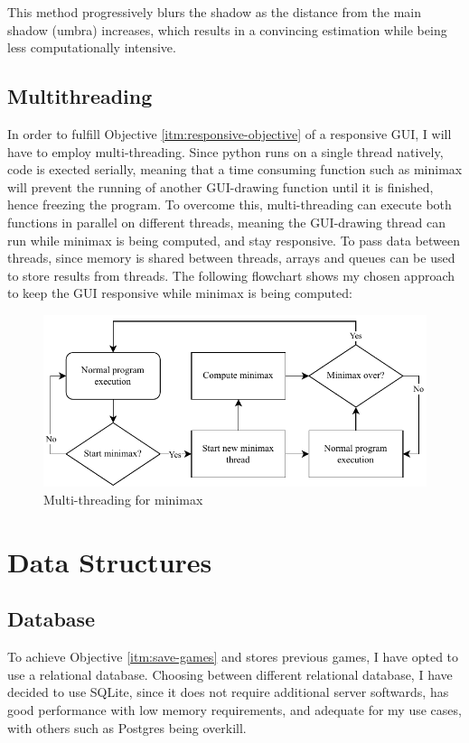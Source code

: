 \documentclass[../main/main.tex]{subfiles}
\begin{document}
This method progressively blurs the shadow as the distance from the main shadow (umbra) increases, which results in a convincing estimation while being less computationally intensive.

\subsection{Multithreading}
\label{sec:design-multithreading}
In order to fulfill Objective \ref{itm:responsive-objective} of a responsive GUI, I will have to employ multi-threading. Since python runs on a single thread natively, code is exected serially, meaning that a time consuming function such as minimax will prevent the running of another GUI-drawing function until it is finished, hence freezing the program. To overcome this, multi-threading can execute both functions in parallel on different threads, meaning the GUI-drawing thread can run while minimax is being computed, and stay responsive. To pass data between threads, since memory is shared between threads, arrays and queues can be used to store results from threads. The following flowchart shows my chosen approach to keep the GUI responsive while minimax is being computed:

\begin{figure}[H]
    \centering
    \includegraphics[width=\columnwidth]{../design/assets/multi_threading.pdf}
    \caption{Multi-threading for minimax}
    \label{fig:multi-threading}
\end{figure}

\section{Data Structures}
\subsection{Database}
To achieve Objective \ref{itm:save-games} and stores previous games, I have opted to use a relational database. Choosing between different relational database, I have decided to use SQLite, since it does not require additional server softwards, has good performance with low memory requirements, and adequate for my use cases, with others such as Postgres being overkill.
\end{document}
